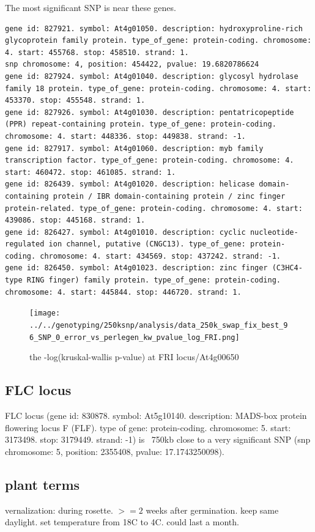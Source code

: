 \documentclass[a4paper,10pt]{article}
\begin{document}
The most significant SNP is near these genes.
\begin{verbatim}
gene id: 827921. symbol: At4g01050. description: hydroxyproline-rich glycoprotein family protein. type_of_gene: protein-coding. chromosome: 4. start: 455768. stop: 458510. strand: 1.
snp chromosome: 4, position: 454422, pvalue: 19.6820786624
gene id: 827924. symbol: At4g01040. description: glycosyl hydrolase family 18 protein. type_of_gene: protein-coding. chromosome: 4. start: 453370. stop: 455548. strand: 1.
gene id: 827926. symbol: At4g01030. description: pentatricopeptide (PPR) repeat-containing protein. type_of_gene: protein-coding. chromosome: 4. start: 448336. stop: 449838. strand: -1.
gene id: 827917. symbol: At4g01060. description: myb family transcription factor. type_of_gene: protein-coding. chromosome: 4. start: 460472. stop: 461085. strand: 1.
gene id: 826439. symbol: At4g01020. description: helicase domain-containing protein / IBR domain-containing protein / zinc finger protein-related. type_of_gene: protein-coding. chromosome: 4. start: 439086. stop: 445168. strand: 1.
gene id: 826427. symbol: At4g01010. description: cyclic nucleotide-regulated ion channel, putative (CNGC13). type_of_gene: protein-coding. chromosome: 4. start: 434569. stop: 437242. strand: -1.
gene id: 826450. symbol: At4g01023. description: zinc finger (C3HC4-type RING finger) family protein. type_of_gene: protein-coding. chromosome: 4. start: 445844. stop: 446720. strand: 1.
\end{verbatim}

\begin{figure}
\texttt{[image: ../../genotyping/250ksnp/analysis/data\_250k\_swap\_fix\_best\_96\_SNP\_0\_error\_vs\_perlegen\_kw\_pvalue\_log\_FRI.png]}
\caption{the -log(kruskal-wallis p-value) at FRI locus/At4g00650}\label{f31}
\end{figure}

\subsection{FLC locus}
FLC locus (gene id: 830878. symbol: At5g10140. description: MADS-box protein flowering locus F (FLF). type of gene: protein-coding. chromosome: 5. start: 3173498. stop: 3179449. strand: -1) is ~750kb close to a very significant SNP (snp chromosome: 5, position: 2355408, pvalue: 17.1743250098).

\subsection{plant terms}
vernalization: during rosette. $>=2$ weeks after germination. keep same daylight. set temperature from 18C to 4C. could last a month.
\end{document}

